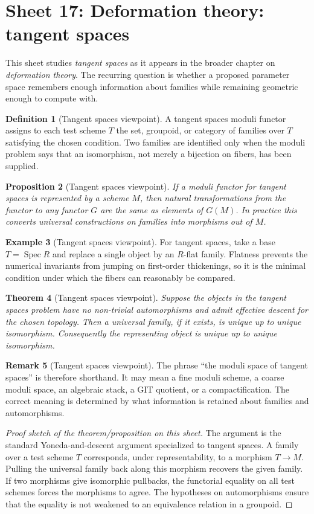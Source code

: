 \documentclass[11pt]{amsart}
\newtheorem{theorem}{Theorem}[section]
\newtheorem{proposition}[theorem]{Proposition}
\theoremstyle{definition}
\newtheorem{definition}[theorem]{Definition}
\newtheorem{example}[theorem]{Example}
\newtheorem{remark}[theorem]{Remark}
\newcommand{\Spec}{\operatorname{Spec}}
\begin{document}
\section{Sheet 17: Deformation theory: tangent spaces}
This sheet studies \emph{tangent spaces} as it appears in the broader chapter on \emph{deformation theory}.  The recurring question is whether a proposed parameter space remembers enough information about families while remaining geometric enough to compute with.
\begin{definition}[Tangent spaces viewpoint]
A tangent spaces moduli functor assigns to each test scheme $T$ the set, groupoid, or category of families over $T$ satisfying the chosen condition.  Two families are identified only when the moduli problem says that an isomorphism, not merely a bijection on fibers, has been supplied.
\end{definition}
\begin{proposition}[Tangent spaces viewpoint]
If a moduli functor for tangent spaces is represented by a scheme $M$, then natural transformations from the functor to any functor $G$ are the same as elements of $G(M)$.  In practice this converts universal constructions on families into morphisms out of $M$.
\end{proposition}
\begin{example}[Tangent spaces viewpoint]
For tangent spaces, take a base $T=\Spec R$ and replace a single object by an $R$-flat family.  Flatness prevents the numerical invariants from jumping on first-order thickenings, so it is the minimal condition under which the fibers can reasonably be compared.
\end{example}
\begin{theorem}[Tangent spaces viewpoint]
Suppose the objects in the tangent spaces problem have no non-trivial automorphisms and admit effective descent for the chosen topology.  Then a universal family, if it exists, is unique up to unique isomorphism.  Consequently the representing object is unique up to unique isomorphism.
\end{theorem}
\begin{remark}[Tangent spaces viewpoint]
The phrase ``the moduli space of tangent spaces'' is therefore shorthand.  It may mean a fine moduli scheme, a coarse moduli space, an algebraic stack, a GIT quotient, or a compactification.  The correct meaning is determined by what information is retained about families and automorphisms.
\end{remark}
\begin{proof}[Proof sketch of the theorem/proposition on this sheet]
The argument is the standard Yoneda-and-descent argument specialized to tangent spaces.  A family over a test scheme $T$ corresponds, under representability, to a morphism $T\to M$.  Pulling the universal family back along this morphism recovers the given family.  If two morphisms give isomorphic pullbacks, the functorial equality on all test schemes forces the morphisms to agree.  The hypotheses on automorphisms ensure that the equality is not weakened to an equivalence relation in a groupoid.
\end{proof}
\end{document}
